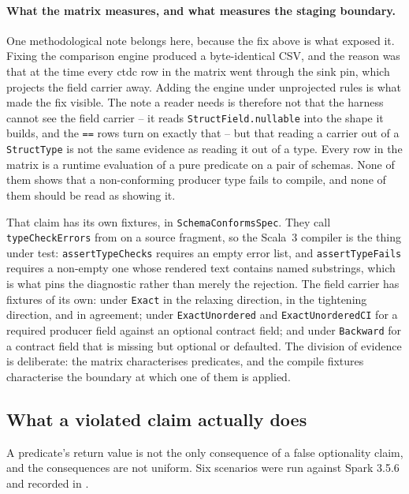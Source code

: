 \paragraph{What the matrix measures, and what measures the staging boundary.}
\label{sec:staging}
One methodological note belongs here, because the fix above is what exposed it. Fixing the comparison engine produced a byte-identical CSV, and the reason was that at the time every ctdc row in the matrix went through the sink pin, which projects the field carrier away. Adding the engine under unprojected rules is what made the fix visible. The note a reader needs is therefore not that the harness cannot see the field carrier -- it reads \texttt{StructField.nullable} into the shape it builds, and the \texttt{==} rows turn on exactly that -- but that reading a carrier out of a \texttt{StructType} is not the same evidence as reading it out of a type. Every row in the matrix is a runtime evaluation of a pure predicate on a pair of schemas. None of them shows that a non-conforming producer type fails to compile, and none of them should be read as showing it.

That claim has its own fixtures, in \texttt{Schema\allowbreak Conforms\allowbreak Spec}. They call \texttt{type\allowbreak Check\allowbreak Errors} from  on a source fragment, so the Scala~3 compiler is the thing under test: \texttt{assert\allowbreak Type\allowbreak Checks} requires an empty error list, and \texttt{assert\allowbreak Type\allowbreak Fails} requires a non-empty one whose rendered text contains named substrings, which is what pins the diagnostic rather than merely the rejection. The field carrier has fixtures of its own: under \texttt{Exact} in the relaxing direction, in the tightening direction, and in agreement; under \texttt{Exact\allowbreak Unordered} and \texttt{Exact\allowbreak Unordered\allowbreak CI} for a required producer field against an optional contract field; and under \texttt{Backward} for a contract field that is missing but optional or defaulted. The division of evidence is deliberate: the matrix characterises predicates, and the compile fixtures characterise the boundary at which one of them is applied.

\subsection{What a violated claim actually does}

A predicate's return value is not the only consequence of a false optionality claim, and the consequences are not uniform. Six scenarios were run against Spark 3.5.6 and recorded in .


